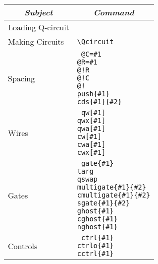 \documentclass[twocolumn,nofootinbib]{revtex4}
\begin{document}
{\small \begin{center}
    \begin{tabular}{l | l } 
        \multicolumn{1}{c}{\itshape Subject} & \multicolumn{1}{c}{\itshape Command }\\ \hline 
        Loading Q-circuit \hspace{.5em} & \verb== \\
        Making Circuits & \verb=\Qcircuit= \\
        Spacing & \parbox[t]{6cm}{\tt
                    @C=\#1 \\
                    @R=\#1 \\
                    @!R \\
                    @!C \\
                    @! \\
                     push\{\#1\} \\
                     cds\{\#1\}\{\#2\}}\\
        Wires & \parbox[t]{6cm}{\tt
                     qw[\#1] \\
                     qwx[\#1] \\
                     qwa[\#1] \\
                     cw[\#1] \\
                     cwa[\#1] \\
                     cwx[\#1] }\\
        Gates & \parbox[t]{6cm}{\tt
                     gate\{\#1\} \\
                     targ \\
                     qswap \\
                     multigate\{\#1\}\{\#2\} \\
                     cmultigate\{\#1\}\{\#2\} \\
                     sgate\{\#1\}\{\#2\}\\
                     ghost\{\#1\} \\
                     cghost\{\#1\} \\
                     nghost\{\#1\} }\\
        Controls & \parbox[t]{6cm}{\tt
                     ctrl\{\#1\} \\
                     ctrlo\{\#1\} \\
                     cctrl\{\#1\} \\
}
\end{tabular}
\end{center}}
\end{document}
